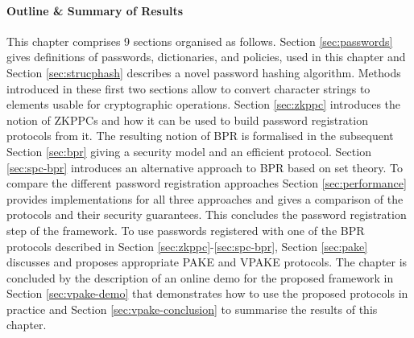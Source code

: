 \paragraph{Outline \& Summary of Results}
This chapter comprises 9 sections organised as follows.
Section \ref{sec:passwords} gives definitions of passwords, dictionaries, and policies, used in this chapter and Section \ref{sec:strucphash} describes a novel password hashing algorithm.
Methods introduced in these first two sections allow to convert character strings to elements usable for cryptographic operations.
Section \ref{sec:zkppc} introduces the notion of \acp{ZKPPC} and how it can be used to build password registration protocols from it.
The resulting notion of \ac{BPR} is formalised in the subsequent Section \ref{sec:bpr} giving a security model and an efficient protocol.
Section \ref{sec:spc-bpr} introduces an alternative approach to \ac{BPR} based on set theory.
To compare the different password registration approaches Section \ref{sec:performance} provides implementations for all three approaches and gives a comparison of the protocols and their security guarantees.
This concludes the password registration step of the framework.
To use passwords registered with one of the \ac{BPR} protocols described in Section \ref{sec:zkppc}-\ref{sec:spc-bpr}, Section \ref{sec:pake} discusses and proposes appropriate \ac{PAKE} and \ac{VPAKE} protocols.
The chapter is concluded by the description of an online demo for the proposed framework in Section \ref{sec:vpake-demo} that demonstrates how to use the proposed protocols in practice and Section \ref{sec:vpake-conclusion} to summarise the results of this chapter.















